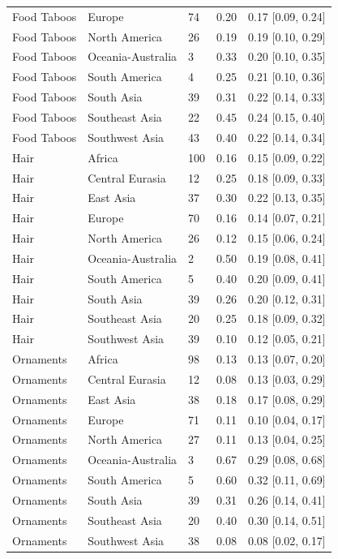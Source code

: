 \begin{longtable}{lllll}
Food Taboos & Europe & 74 & 0.20 & 0.17 [0.09, 0.24] \\
Food Taboos & North America & 26 & 0.19 & 0.19 [0.10, 0.29] \\
Food Taboos & Oceania-Australia & 3 & 0.33 & 0.20 [0.10, 0.35] \\
Food Taboos & South America & 4 & 0.25 & 0.21 [0.10, 0.36] \\
Food Taboos & South Asia & 39 & 0.31 & 0.22 [0.14, 0.33] \\
Food Taboos & Southeast Asia & 22 & 0.45 & 0.24 [0.15, 0.40] \\
Food Taboos & Southwest Asia & 43 & 0.40 & 0.22 [0.14, 0.34] \\
Hair & Africa & 100 & 0.16 & 0.15 [0.09, 0.22] \\
Hair & Central Eurasia & 12 & 0.25 & 0.18 [0.09, 0.33] \\
Hair & East Asia & 37 & 0.30 & 0.22 [0.13, 0.35] \\
Hair & Europe & 70 & 0.16 & 0.14 [0.07, 0.21] \\
Hair & North America & 26 & 0.12 & 0.15 [0.06, 0.24] \\
Hair & Oceania-Australia & 2 & 0.50 & 0.19 [0.08, 0.41] \\
Hair & South America & 5 & 0.40 & 0.20 [0.09, 0.41] \\
Hair & South Asia & 39 & 0.26 & 0.20 [0.12, 0.31] \\
Hair & Southeast Asia & 20 & 0.25 & 0.18 [0.09, 0.32] \\
Hair & Southwest Asia & 39 & 0.10 & 0.12 [0.05, 0.21] \\
Ornaments & Africa & 98 & 0.13 & 0.13 [0.07, 0.20] \\
Ornaments & Central Eurasia & 12 & 0.08 & 0.13 [0.03, 0.29] \\
Ornaments & East Asia & 38 & 0.18 & 0.17 [0.08, 0.29] \\
Ornaments & Europe & 71 & 0.11 & 0.10 [0.04, 0.17] \\
Ornaments & North America & 27 & 0.11 & 0.13 [0.04, 0.25] \\
Ornaments & Oceania-Australia & 3 & 0.67 & 0.29 [0.08, 0.68] \\
Ornaments & South America & 5 & 0.60 & 0.32 [0.11, 0.69] \\
Ornaments & South Asia & 39 & 0.31 & 0.26 [0.14, 0.41] \\
Ornaments & Southeast Asia & 20 & 0.40 & 0.30 [0.14, 0.51] \\
Ornaments & Southwest Asia & 38 & 0.08 & 0.08 [0.02, 0.17] \\

\end{longtable}
